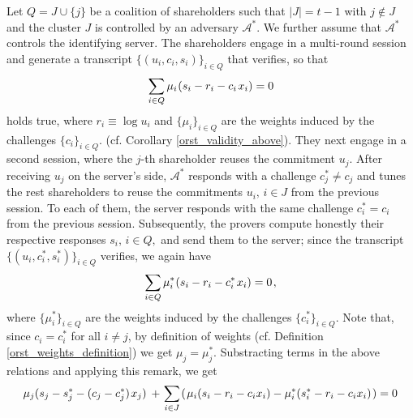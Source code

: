 \documentclass{iacrtrans}
\begin{document}
Let $Q = J \cup \{j\}$ be a coalition of shareholders
such that $|J| = t-1$ with $j \not \in J$
and the cluster $J$ is controlled by an adversary $\mathcal{A}^*$.
We further assume that $\mathcal{A}^*$
controls the identifying server.
The shareholders engage in a multi-round
session and generate a transcript $\{(u_i, c_i, s_i)\}_{i \in Q}$
that verifies, so that
\vspace{5pt}
\begin{equation*}
\sum_{i \in Q}
\mu_i\hspace{0.5pt} (s_i - r_i - c_i\hspace{1pt}x_i)
=
0
\vspace{5pt}
\end{equation*}
holds true,
where $r_i \equiv \log u_i$
and $\{\mu_i\}_{i \in Q}$ are the weights
induced by the challenges $\{c_i\}_{i \in Q}$.
(cf. Corollary \ref{orst_validity_above}).
They next engage in a second session,
where the $j$-th shareholder reuses the commitment $u_j$.
After receiving $u_j$ on the server's side,
$\mathcal{A}^*$ responds with a challenge $c_j^* \neq c_j$
and tunes the rest shareholders to
reuse the commitments $u_i,\hspace{2pt} i \in J$
from the previous session. To each of them,
the server responds with the same challenge
$c_i^* = c_i$
from the previous session.
Subsequently, the provers compute honestly their respective
responses $s_i,\hspace{2pt} i \in Q,$
and send them to the server;
since the transcript $\{(u_i, c_i^*, s_i^*)\}_{i \in Q}$
verifies, we again have
\vspace{5pt}
\begin{equation*}
\sum_{i \in Q}
\mu_i^*\hspace{0.5pt} (s_i - r_i - c_i^*\hspace{1pt}x_i)
=
0\hspace{1pt},
\vspace{5pt}
\end{equation*}
where $\{\mu_i^*\}_{i \in Q}$ are the weights induced
by the challenges $\{c_i^*\}_{i \in Q}$.
Note that,
since $c_i = c_i^*$ for all $i \neq j$,
by definition of weights
(cf. Definition \ref{orst_weights_definition})
we get $\mu_j = \mu_j^*$.
Substracting terms in the above relations and applying this remark,
we get
\vspace{5pt}
\begin{equation*}
\mu_j (s_j - s_j^* - (c_j - c_j^*)\hspace{1pt} x_j)
\hspace{2pt}
+
\hspace{1pt}
\sum_{i \in J}\hspace{1pt}
(
\hspace{1pt}
\mu_i (s_i - r_i - c_i x_i)
-
\mu_i^* (s_i^* - r_i - c_i x_i)
\hspace{1pt}
)
=
0\hspace{1pt}
\vspace{5pt}
\end{equation*}
\end{document}

